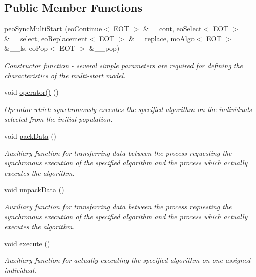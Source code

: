 \subsection*{Public Member Functions}
\begin{CompactItemize}
\item 
\hyperlink{classpeoSyncMultiStart_d29f94aad3c1f443bfffc8b6aee0704c}{peo\-Sync\-Multi\-Start} (eo\-Continue$<$ EOT $>$ \&\_\-\_\-cont, eo\-Select$<$ EOT $>$ \&\_\-\_\-select, eo\-Replacement$<$ EOT $>$ \&\_\-\_\-replace, mo\-Algo$<$ EOT $>$ \&\_\-\_\-ls, eo\-Pop$<$ EOT $>$ \&\_\-\_\-pop)
\begin{CompactList}\small\item\em Constructor function - several simple parameters are required for defining the characteristics of the multi-start model. \item\end{CompactList}\item 
void \hyperlink{classpeoSyncMultiStart_76385b33fe514f91cb83f0fbecbeb3c2}{operator()} ()
\begin{CompactList}\small\item\em Operator which synchronously executes the specified algorithm on the individuals selected from the initial population. \item\end{CompactList}\item 
void \hyperlink{classpeoSyncMultiStart_8becfab1922b64708dca5a53e2932a5a}{pack\-Data} ()
\begin{CompactList}\small\item\em Auxiliary function for transferring data between the process requesting the synchronous execution of the specified algorithm and the process which actually executes the algorithm. \item\end{CompactList}\item 
void \hyperlink{classpeoSyncMultiStart_2903a441b77cded266b5fb651e17a5b5}{unpack\-Data} ()
\begin{CompactList}\small\item\em Auxiliary function for transferring data between the process requesting the synchronous execution of the specified algorithm and the process which actually executes the algorithm. \item\end{CompactList}\item 
void \hyperlink{classpeoSyncMultiStart_a4d1c2943c290de540800087b54dc49b}{execute} ()
\begin{CompactList}\small\item\em Auxiliary function for actually executing the specified algorithm on one assigned individual. \item\end{CompactList}\item 

\end{CompactItemize}
